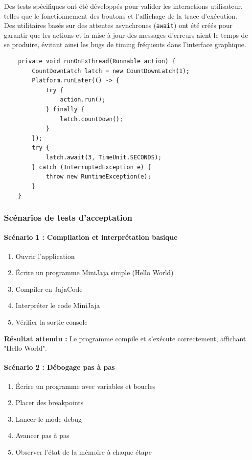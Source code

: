 Des tests spécifiques ont été développés pour valider les interactions utilisateur, telles que le fonctionnement des boutons et l'affichage de la trace d'exécution. Des utilitaires basés sur des attentes asynchrones (\texttt{await}) ont été créés pour garantir que les actions et la mise à jour des messages d'erreurs aient le temps de se produire, évitant ainsi les bugs de timing fréquents dans l'interface graphique.

\begin{verbatim}
    private void runOnFxThread(Runnable action) {
        CountDownLatch latch = new CountDownLatch(1);
        Platform.runLater(() -> {
            try {
                action.run();
            } finally {
                latch.countDown();
            }
        });
        try {
            latch.await(3, TimeUnit.SECONDS);
        } catch (InterruptedException e) {
            throw new RuntimeException(e);
        }
    }
\end{verbatim}

\subsubsection{Scénarios de tests d'acceptation}

\paragraph{Scénario 1 : Compilation et interprétation basique}
\begin{enumerate}
    \item Ouvrir l'application
    \item Écrire un programme MiniJaja simple (Hello World)
    \item Compiler en JajaCode
    \item Interpréter le code MiniJaja
    \item Vérifier la sortie console
\end{enumerate}

\textbf{Résultat attendu :} Le programme compile et s'exécute correctement, affichant "Hello World".

\paragraph{Scénario 2 : Débogage pas à pas}
\begin{enumerate}
    \item Écrire un programme avec variables et boucles
    \item Placer des breakpoints
    \item Lancer le mode debug
    \item Avancer pas à pas
    \item Observer l'état de la mémoire à chaque étape
\end{enumerate}

